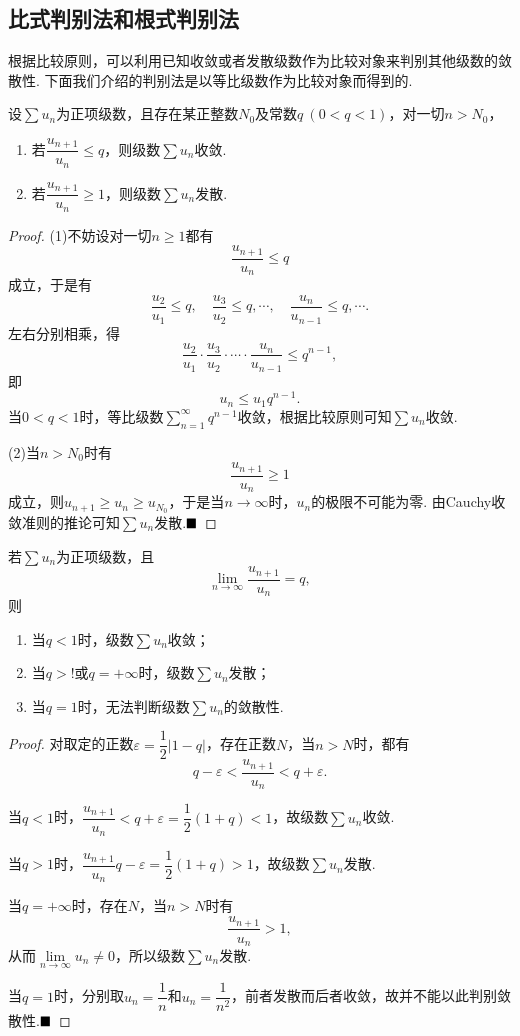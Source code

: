\subsection{比式判别法和根式判别法}
根据比较原则，可以利用已知收敛或者发散级数作为比较对象来判别其他级数的敛散性. 下面我们介绍的判别法是以等比级数作为比较对象而得到的.
\begin{theorem}[D'Alembert比式判别法]
	设$\sum u_n$为正项级数，且存在某正整数$N_0$及常数$q\ (0<q<1)$，对一切$n>N_0$，
	\begin{enumerate}[(1)]
		\item 若$\dfrac{u_{n+1}}{u_n}\leqslant q$，则级数$\sum u_n$收敛.
		\item 若$\dfrac{u_{n+1}}{u_n}\geqslant 1$，则级数$\sum u_n$发散.
	\end{enumerate}
\end{theorem}
\begin{proof}
	(1)不妨设对一切$n\geqslant 1$都有
	$$\frac{u_{n+1}}{u_n}\leqslant q$$
	成立，于是有
	$$\frac{u_2}{u_1}\leqslant q,\quad \frac{u_3}{u_2}\leqslant q,\cdots,\quad \frac{u_n}{u_{n-1}}\leqslant q,\cdots.$$
	左右分别相乘，得
	$$\frac{u_2}{u_1}\cdot\frac{u_3}{u_2}\cdot\cdots\cdot\frac{u_n}{u_{n-1}}\leqslant q^{n-1},$$
	即
	$$u_n\leqslant u_1 q^{n-1}.$$
	当$0<q<1$时，等比级数$\sum\limits_{n=1}^{\infty}q^{n-1}$收敛，根据比较原则可知$\sum u_n$收敛.
	
	(2)当$n>N_0$时有
	$$\frac{u_{n+1}}{u_n}\geqslant 1$$
	成立，则$u_{n+1}\geqslant u_n\geqslant u_{N_0}$，于是当$n\to\infty$时，$u_n$的极限不可能为零. 由Cauchy收敛准则的推论可知$\sum u_n$发散.$\hfill\blacksquare$
\end{proof}
\begin{corollary}[D'Alembert判别法的极限形式]
	若$\sum u_n$为正项级数，且
	$$\lim\limits_{n\to\infty}\frac{u_{n+1}}{u_n}=q,$$
	则
	\begin{enumerate}[(1)]
		\item 当$q<1$时，级数$\sum u_n$收敛；
		\item 当$q>!$或$q=+\infty$时，级数$\sum u_n$发散；
		\item 当$q=1$时，无法判断级数$\sum u_n$的敛散性.
	\end{enumerate}
\end{corollary}
\begin{proof}
	对取定的正数$\varepsilon=\dfrac{1}{2}|1-q|$，存在正数$N$，当$n>N$时，都有
	$$q-\varepsilon<\frac{u_{n+1}}{u_n}<q+\varepsilon.$$
	
	当$q<1$时，$\dfrac{u_{n+1}}{u_n}<q+\varepsilon=\dfrac{1}{2}(1+q)<1$，故级数$\sum u_n$收敛.
	
	当$q>1$时，$\dfrac{u_{n+1}}{u_n}q-\varepsilon=\dfrac{1}{2}(1+q)>1$，故级数$\sum u_n$发散.
	
	当$q=+\infty$时，存在$N$，当$n>N$时有
	$$\frac{u_{n+1}}{u_n}>1,$$
	从而$\lim\limits_{n\to\infty}u_n\neq 0$，所以级数$\sum u_n$发散.
	
	当$q=1$时，分别取$u_n=\dfrac{1}{n}$和$u_n=\dfrac{1}{n^2}$，前者发散而后者收敛，故并不能以此判别敛散性.$\hfill\blacksquare$
\end{proof}
